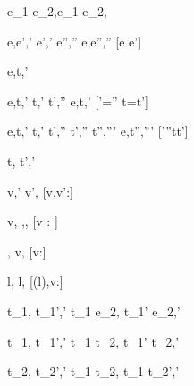   { }
  {e_1 \Pick e_2,\sigma \stride e_1 \Pick e_2,\sigma}

    {e,\sigma \eval e',\sigma'  \Quad
     e',\sigma' \stride e'',\sigma''}
    {e,\sigma \stride e'',\sigma''}
    [e \neq e']



  {e,\sigma \normalise t,\sigma'}


    {e,\sigma \eval t,\sigma' \Quad
     t,\sigma' \stride t',\sigma''}
    {e,\sigma \normalise t,\sigma'}
    [\sigma'=\sigma'' \land t=t']

    {e,\sigma \eval t,\sigma'  \Quad
     t,\sigma' \stride t',\sigma''  \Quad
     t',\sigma'' \normalise t'',\sigma'''}
    {e,\sigma \normalise t'',\sigma'''}
    [\sigma'\neq \sigma''\vee t\neq t']




  {t,\sigma {} t',\sigma'}


  { }
  {\Update v,\sigma {}' \Update v',\sigma}
  [v,v':\tau]

  { }
  {\Update v,\sigma \handle{\Empty} \Enter \tau,\sigma,\True}
  [v : \tau]

  { }
  {\Enter \tau,\sigma {} \Update v,\sigma}
  [v:\tau]

  { }
  {\Update l,\sigma {} \Update l,\sigma[l \mapsto v]}
  [\sigma(l),v:\tau]

  {t_1,\sigma {} t_1',\sigma'}
  {t_1 \Step e_2,\sigma {} t_1' \Step e_2,\sigma'}




  {t_1,\sigma {} t_1',\sigma'}
  {t_1 \Pair t_2,\sigma {} t_1' \Pair t_2,\sigma'}

  {t_2,\sigma {} t_2',\sigma'}
  {t_1 \Pair t_2,\sigma {} t_1 \Pair t_2',\sigma'}


